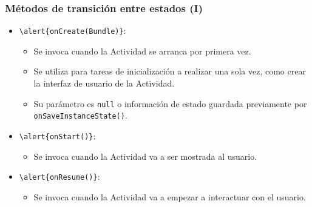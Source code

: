 \documentclass[hyperref={pdfpagelabels=true},ucs]{beamer}
\begin{document}
\begin{frame}[fragile]
\frametitle{Métodos de transición entre estados (I)}

\begin{itemize}
\item \Verb|\alert{onCreate(Bundle)}|:
  \begin{itemize}
  \item Se invoca cuando la Actividad se arranca por primera vez.
  \item Se utiliza para tareas de inicialización a realizar una sola
    vez, como crear la interfaz de usuario de la Actividad.
  \item Su parámetro es \verb|null| o información de estado guardada
    previamente por \verb|onSaveInstanceState()|.
  \end{itemize}
 
\item \Verb|\alert{onStart()}|:
  \begin{itemize}
  \item Se invoca cuando la Actividad va a ser mostrada al usuario.
  \end{itemize}

\item \Verb|\alert{onResume()}|:
  \begin{itemize}
  \item Se invoca cuando la Actividad va a empezar a interactuar con
    el usuario.
  \end{itemize}

\end{itemize}
\end{frame}
\end{document}

